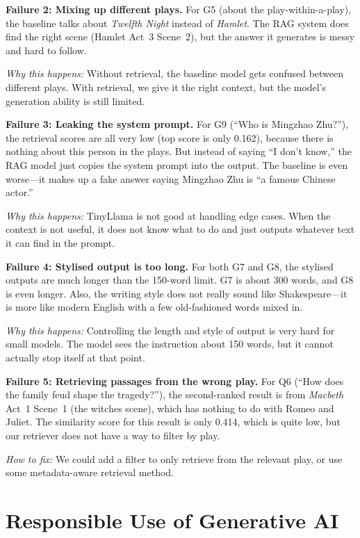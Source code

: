 \documentclass[10pt,conference]{IEEEtran}
\begin{document}
\textbf{Failure 2: Mixing up different plays.}
For G5 (about the play-within-a-play), the baseline talks about \textit{Twelfth Night} instead of \textit{Hamlet}. The RAG system does find the right scene (Hamlet Act~3 Scene~2), but the answer it generates is messy and hard to follow.

\textit{Why this happens:} Without retrieval, the baseline model gets confused between different plays. With retrieval, we give it the right context, but the model's generation ability is still limited.

\textbf{Failure 3: Leaking the system prompt.}
For G9 (``Who is Mingzhao Zhu?''), the retrieval scores are all very low (top score is only 0.162), because there is nothing about this person in the plays. But instead of saying ``I don't know,'' the RAG model just copies the system prompt into the output. The baseline is even worse---it makes up a fake answer saying Mingzhao Zhu is ``a famous Chinese actor.''

\textit{Why this happens:} TinyLlama is not good at handling edge cases. When the context is not useful, it does not know what to do and just outputs whatever text it can find in the prompt.

\textbf{Failure 4: Stylised output is too long.}
For both G7 and G8, the stylised outputs are much longer than the 150-word limit. G7 is about 300 words, and G8 is even longer. Also, the writing style does not really sound like Shakespeare---it is more like modern English with a few old-fashioned words mixed in.

\textit{Why this happens:} Controlling the length and style of output is very hard for small models. The model sees the instruction about 150 words, but it cannot actually stop itself at that point.

\textbf{Failure 5: Retrieving passages from the wrong play.}
For Q6 (``How does the family feud shape the tragedy?''), the second-ranked result is from \textit{Macbeth} Act~1 Scene~1 (the witches scene), which has nothing to do with Romeo and Juliet. The similarity score for this result is only 0.414, which is quite low, but our retriever does not have a way to filter by play.

\textit{How to fix:} We could add a filter to only retrieve from the relevant play, or use some metadata-aware retrieval method.

\section{Responsible Use of Generative AI}
\label{sec:genai}
\end{document}
